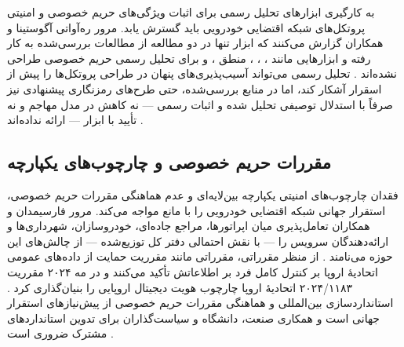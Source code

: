 به کارگیری ابزارهای تحلیل رسمی برای اثبات ویژگی‌های حریم خصوصی و امنیتی پروتکل‌های شبکه اقتضایی خودرویی باید گسترش یابد. مرور ره‌آواتی آگوستینا و همکاران گزارش می‌کنند که ابزار  تنها در دو مطالعه از مطالعات بررسی‌شده به کار رفته و ابزارهایی مانند ، ، ، منطق ،  و  برای تحلیل رسمی حریم خصوصی طراحی نشده‌اند \cite{rahmawatiagustinaSystematicLiteratureReview2025}. تحلیل رسمی می‌تواند آسیب‌پذیری‌های پنهان در طراحی پروتکل‌ها را پیش از اسقرار آشکار کند، اما در منابع بررسی‌شده، حتی طرح‌های رمزنگاری پیشنهادی نیز صرفاً با استدلال توصیفی تحلیل شده و اثبات رسمی — نه کاهش در مدل مهاجم و نه تأیید با ابزار — ارائه نداده‌اند \cite{mariaBAIVEfficientBlockchainBased2022, rahmawatiagustinaSystematicLiteratureReview2025}.

\subsection{مقررات حریم خصوصی و چارچوب‌های یکپارچه}

فقدان چارچوب‌های امنیتی یکپارچه بین‌لایه‌ای و عدم هماهنگی مقررات حریم خصوصی، استقرار جهانی شبکه اقتضایی خودرویی را با مانع مواجه می‌کند. مرور فارسیمدان و همکاران تعامل‌پذیری میان اپراتورها، مراجع جاده‌ای، خودروسازان، شهرداری‌ها و ارائه‌دهندگان سرویس را — با نقش احتمالی دفتر کل توزیع‌شده — از چالش‌های این حوزه می‌نامند \cite{farsimadanReviewSecurityChallenges2025}. از منظر مقرراتی، مقرراتی مانند مقرریت حمایت از داده‌های عمومی اتحادیهٔ اروپا بر کنترل کامل فرد بر اطلاعاتش تأکید می‌کنند و در مه ۲۰۲۴ مقرریت ۲۰۲۴/۱۱۸۳ اتحادیهٔ اروپا چارچوب هویت دیجیتال اروپایی را بنیان‌گذاری کرد \cite{mazzocca2025survey}. استانداردسازی بین‌المللی و هماهنگی مقررات حریم خصوصی از پیش‌نیازهای استقرار جهانی است و همکاری صنعت، دانشگاه و سیاست‌گذاران برای تدوین استانداردهای مشترک ضروری است \cite{farsimadanReviewSecurityChallenges2025, mazzocca2025survey}.

